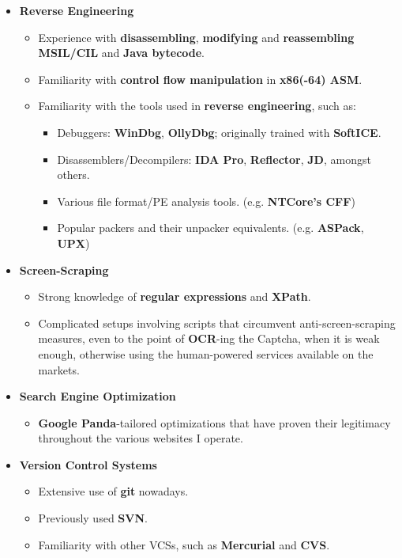 \documentclass[11pt,a4paper]{article}
\begin{document}
\begin{itemize}
\begin{itemize}
\begin{itemize}
			\end{itemize}
		\item	\textbf{Reverse Engineering}
			\begin{itemize}
			\item	Experience with \textbf{disassembling}, \textbf{modifying} and \textbf{reassembling MSIL/CIL} and \textbf{Java bytecode}.
			\item	Familiarity with \textbf{control flow manipulation} in \textbf{x86(-64) ASM}.
			\item	Familiarity with the tools used in \textbf{reverse engineering}, such as:
				\begin{itemize}
				\item	Debuggers: \textbf{WinDbg}, \textbf{OllyDbg}; originally trained with \textbf{SoftICE}.
				\item	Disassemblers/Decompilers: \textbf{IDA Pro}, \textbf{Reflector}, \textbf{JD}, amongst others.
				\item	Various file format/PE analysis tools. (e.g. \textbf{NTCore's CFF})
				\item	Popular packers and their unpacker equivalents. (e.g. \textbf{ASPack}, \textbf{UPX})
				\end{itemize}
			\end{itemize}
		\item	\textbf{Screen-Scraping}
			\begin{itemize}
			\item	Strong knowledge of \textbf{regular expressions} and \textbf{XPath}.
			\item	Complicated setups involving scripts that circumvent anti-screen-scraping measures, even to the point of \textbf{OCR}-ing the Captcha, when it is weak enough, otherwise using the human-powered services available on the markets.
			\end{itemize}
		\item	\textbf{Search Engine Optimization}
			\begin{itemize}
			\item	\textbf{Google Panda}-tailored optimizations that have proven their legitimacy throughout the various websites I operate.
			\end{itemize}
		\item	\textbf{Version Control Systems}
			\begin{itemize}
			\item	Extensive use of \textbf{git} nowadays.
			\item	Previously used \textbf{SVN}.
			\item	Familiarity with other VCSs, such as \textbf{Mercurial} and \textbf{CVS}.

\end{itemize}
\end{itemize}
\end{itemize}
\end{document}
